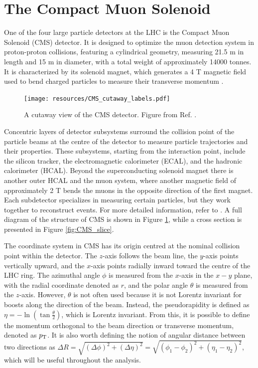 \section{The Compact Muon Solenoid}\label{sec:CMS}

One of the four large particle detectors at the LHC is the Compact Muon Solenoid (CMS) detector. It is designed to optimize the muon detection system in proton-proton collisions, featuring a cylindrical geometry, measuring 21.5 m in length and 15 m in diameter, with a total weight of approximately 14000 tonnes. It is characterized by its solenoid magnet, which generates a 4 T magnetic field used to bend charged particles to measure their transverse momentum \cite{CMS:1994hea, CMS:2008xjf}.

\begin{figure}[!ht]
    \vspace*{-0.0cm}
    \centering
    \setlength{\mylength}{\textwidth}
    \texttt{[image: resources/CMS\_cutaway\_labels.pdf]}
    \vspace*{-0.0cm}
    \caption{A cutaway view of the CMS detector. Figure from Ref. \cite{Sakuma:2013jqa}.}
    \label{fig:CMS_cutaway}
    \vspace*{-0.3cm}
\end{figure}

Concentric layers of detector subsystems surround the collision point of the particle beams at the centre of the detector to measure particle trajectories and their properties. These subsystems, starting from the interaction point, include the silicon tracker, the electromagnetic calorimeter (ECAL), and the hadronic calorimeter (HCAL). Beyond the superconducting solenoid magnet there is another outer HCAL and the muon system, where another magnetic field of approximately 2 T bends the muons in the opposite direction of the first magnet. Each subdetector specializes in measuring certain particles, but they work together to reconstruct events. For more detailed information, refer to \cite{CMS:2006myw}. A full diagram of the structure of CMS is shown in Figure \ref{fig:CMS_cutaway}, while a cross section is presented in Figure \ref{fig:CMS_slice}.

The coordinate system in CMS has its origin centred at the nominal collision point within the detector. The $z$-axis follows the beam line, the $y$-axis points vertically upward, and the $x$-axis points radially inward toward the centre of the LHC ring. The azimuthal angle $\phi$ is measured from the $x$-axis in the $x-y$ plane, with the radial coordinate denoted as $r$, and the polar angle $\theta$ is measured from the $z$-axis. However, $\theta$ is not often used because it is not Lorentz invariant for boosts along the direction of the beam. Instead, the pseudorapidity is defined as $\eta = -\ln{\left(\tan{\frac{\theta}{2}}\right)}$, which is Lorentz invariant. From this, it is possible to define the momentum orthogonal to the beam direction or transverse momentum, denoted as $p_\text{T}$. It is also worth defining the notion of angular distance between two directions as $\Delta R = \sqrt{\left(\Delta\phi\right)^2 + \left(\Delta\eta\right)^2} = \sqrt{\left(\phi_1-\phi_2\right)^2 + \left(\eta_1-\eta_2\right)^2}$, which will be useful throughout the analysis.

